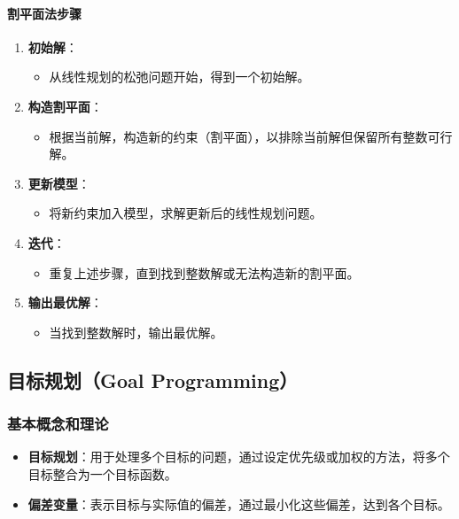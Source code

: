 \documentclass[UTF8]{ctexart}
\begin{document}
\paragraph{割平面法步骤}
\begin{enumerate}
    \item \textbf{初始解}：
        \begin{itemize}
            \item 从线性规划的松弛问题开始，得到一个初始解。
        \end{itemize}
    \item \textbf{构造割平面}：
        \begin{itemize}
            \item 根据当前解，构造新的约束（割平面），以排除当前解但保留所有整数可行解。
        \end{itemize}
    \item \textbf{更新模型}：
        \begin{itemize}
            \item 将新约束加入模型，求解更新后的线性规划问题。
        \end{itemize}
    \item \textbf{迭代}：
        \begin{itemize}
            \item 重复上述步骤，直到找到整数解或无法构造新的割平面。
        \end{itemize}
    \item \textbf{输出最优解}：
        \begin{itemize}
            \item 当找到整数解时，输出最优解。
        \end{itemize}
\end{enumerate}

\subsection {目标规划（Goal Programming）}
\subsubsection {基本概念和理论}
\begin{itemize}
    \item \textbf{目标规划}：用于处理多个目标的问题，通过设定优先级或加权的方法，将多个目标整合为一个目标函数。
    \item \textbf{偏差变量}：表示目标与实际值的偏差，通过最小化这些偏差，达到各个目标。
\end{itemize}
\end{document}
